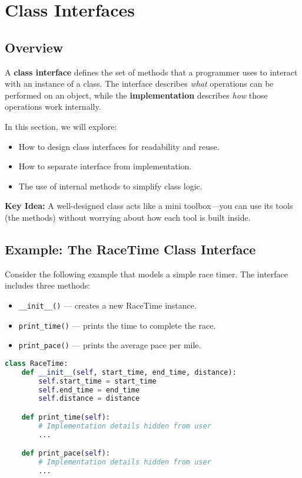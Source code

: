 \chapter{Class Interfaces}
\label{ch:09_07_class_interfaces}

\section{Overview}
A \textbf{class interface} defines the set of methods that a programmer uses to interact with an instance of a class.  
The interface describes \emph{what} operations can be performed on an object, while the \textbf{implementation} describes \emph{how} those operations work internally.

In this section, we will explore:
\begin{itemize}
    \item How to design class interfaces for readability and reuse.
    \item How to separate interface from implementation.
    \item The use of internal methods to simplify class logic.
\end{itemize}

\vspace{1em}
\noindent
\textbf{Key Idea:} A well-designed class acts like a mini toolbox---you can use its tools (the methods) without worrying about how each tool is built inside.

\section{Example: The RaceTime Class Interface}

Consider the following example that models a simple race timer.  
The interface includes three methods:
\begin{itemize}
    \item \texttt{\_\_init\_\_()} — creates a new RaceTime instance.
    \item \texttt{print\_time()} — prints the time to complete the race.
    \item \texttt{print\_pace()} — prints the average pace per mile.
\end{itemize}

\begin{lstlisting}[language=Python, caption={A class interface consists of methods to interact with an instance.}]
class RaceTime:
    def __init__(self, start_time, end_time, distance):
        self.start_time = start_time
        self.end_time = end_time
        self.distance = distance

    def print_time(self):
        # Implementation details hidden from user
        ...

    def print_pace(self):
        # Implementation details hidden from user
        ...
\end{lstlisting}

